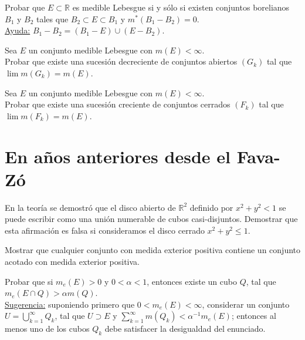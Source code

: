 \documentclass{book}
\newcommand{\rr}{\mathbb{R}}
\newcommand{\di}{\displaystyle}
\begin{document}
\begin{ejer}{}
Probar que $E\subset \rr$ es medible Lebesgue si y s\'olo si existen conjuntos borelianos $B_1$
 y $B_2$ tales que $B_2\subset E\subset B_1$ y $m^*(B_1-B_2)=0$.
\\
\underline{Ayuda:} $B_1-B_2=(B_1-E)\cup (E-B_2)$. 
\end{ejer} 


\begin{ejer}{} 
 Sea $E$ un conjunto medible Lebesgue con $m(E)<\infty$.
\\Probar que existe una sucesi\'on decreciente de conjuntos abiertos $(G_k)$ tal que
$\lim m(G_k)=m (E)$.
\end{ejer} 



\begin{ejer}{} 
 Sea  $E$ un conjunto medible Lebesgue con $m(E)<\infty$.\\
Probar que existe una sucesi\'on creciente de conjuntos cerrados $(F_k)$ tal que
$\lim m(F_k)=m (E)$.
\end{ejer} 


\section{En a\~nos anteriores desde el Fava-Z\'o}

	
\begin{ejer}{}
  En la teoría se demostró que el disco abierto  de $\rr^2$ definido por  $x^2+y^2< 1$ se puede escribir como una unión numerable de cubos casi-disjuntos. Demostrar que esta afirmación es falsa si consideramos el disco cerrado  $x^2+y^2\leq 1$.  
	\end{ejer}



 \begin{ejer}{} 
	Mostrar que cualquier conjunto con medida exterior positiva contiene un conjunto acotado con medida exterior positiva. 
	\end{ejer}
 
  \begin{ejer}{} 
	Probar que si $m_e(E)>0$ y $0<\alpha<1$, entonces existe un cubo $Q$, tal que
  $m_e(E\cap Q)>\alpha m(Q)$.
\\
  \underline{Sugerencia:} suponiendo primero que $0<m_e(E)<\infty$, considerar un conjunto
 $U=\di\bigcup_{k=1}^{\infty}Q_k$, tal que 
  $U\supset E$ y $\sum_{k=1}^{\infty}m(Q_k)<\alpha^{-1} m_e(E)$; entonces al menos uno de los cubos $Q_k$
  debe satisfacer la desigualdad del enunciado.
 \end{ejer} 
\end{document}

